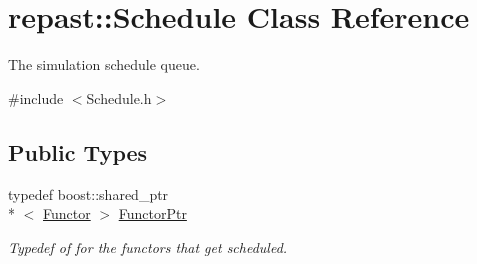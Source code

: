 \hypertarget{classrepast_1_1_schedule}{\section{repast\-:\-:Schedule Class Reference}
\label{classrepast_1_1_schedule}
}


The simulation schedule queue.  




{\ttfamily \#include $<$Schedule.\-h$>$}

\subsection*{Public Types}
\begin{DoxyCompactItemize}
\item 
\hypertarget{classrepast_1_1_schedule_a6a31b68f08a9bb28381ffe02b18f1df3}{typedef boost\-::shared\-\_\-ptr\\*
$<$ \hyperlink{classrepast_1_1_functor}{Functor} $>$ \hyperlink{classrepast_1_1_schedule_a6a31b68f08a9bb28381ffe02b18f1df3}{Functor\-Ptr}}\label{classrepast_1_1_schedule_a6a31b68f08a9bb28381ffe02b18f1df3}

\begin{DoxyCompactList}\small\item\em Typedef of for the functors that get scheduled. \end{DoxyCompactList}\end{DoxyCompactItemize}
